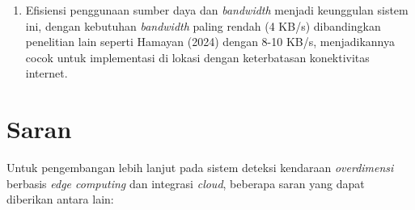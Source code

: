 \begin{enumerate}[nolistsep]
  \item Efisiensi penggunaan sumber daya dan \emph{bandwidth} menjadi keunggulan sistem ini, dengan kebutuhan \emph{bandwidth} paling rendah (4 KB/s) dibandingkan penelitian lain seperti Hamayan (2024) dengan 8-10 KB/s, menjadikannya cocok untuk implementasi di lokasi dengan keterbatasan konektivitas internet.

\end{enumerate}

\section{Saran}
\label{sec:saran}

Untuk pengembangan lebih lanjut pada sistem deteksi kendaraan \emph{overdimensi} berbasis \emph{edge computing} dan integrasi \emph{cloud}, beberapa saran yang dapat diberikan antara lain:

